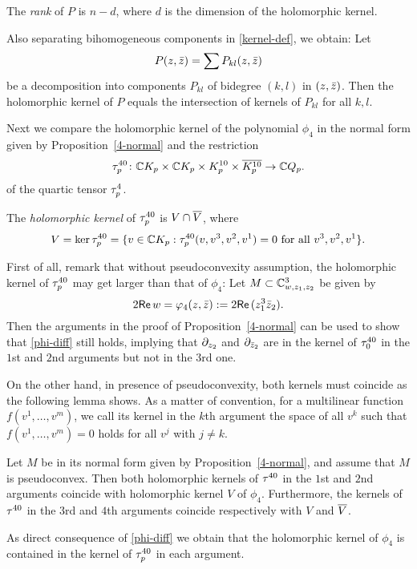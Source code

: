 \documentclass[12pt]{amsart}
\begin{document}
\bd{}
	The {\em rank} of $P$ is $n-d$, where $d$ is the dimension of the holomorphic kernel.
\ed

Also separating bihomogeneous components in \eqref{kernel-def}, we obtain:
\bl
	Let 
	$$
		P(z,{\bar z})=\sum P_{kl}(z,{\bar z})
	$$ 
	be a decomposition into components $P_{kl}$ of bidegree $(k,l)$ in $(z,{\bar z})$.
	Then the holomorphic kernel of $P$ equals the intersection of kernels of $P_{kl}$ for all $k,l$.
\el

Next we compare the holomorphic kernel of the polynomial $\phi_4$
in the normal form given by Proposition~\ref{4-normal}
and the restriction 
$$
	\tau^{40}_p \colon {\mathbb{C}} K_p \times {\mathbb{C}} K_p \times K^{10}_p \times \overline{K^{10}_p} \to {\mathbb{C}} Q_p.
$$
of the quartic tensor $\tau^4_p$.

\bd
The {\em holomorphic kernel} of $\tau^{40}_p$ is 
$V\cap \overline{V}$, where
$$
	V = \ker \tau^{40}_p = \{ v\in {\mathbb{C}} K_p : 
		\tau^{40}_p(v, v^3, v^2, v^1) =0
		\text{ for all }
		v^3, v^2, v^1\}.
$$
\ed

First of all, remark that 
without pseudoconvexity assumption,
the holomorphic kernel of $\tau^{40}_p$
may get larger than that of $\phi_4$:
\be{}
Let $M\subset {\mathbb{C}}^3_{w, z_1, z_2}$ be given by
$$
	2{\sf Re}\, w = \varphi_4(z,{\bar z}):= 2{\sf Re}\, (z_1^3 {\bar z}_2).
$$
Then the arguments in the proof of Proposition~\ref{4-normal}
can be used to show that \eqref{phi-diff} still holds,
implying that $\partial_{z_2}$ and $\partial_{{\bar z}_2}$
are in the kernel of $\tau^{40}_0$
in the $1$st and $2$nd arguments
but not in the $3$rd one.
\ee

On the other hand, in presence of pseudoconvexity,
both kernels must coincide as the following lemma shows.
As a matter of convention, for a multilinear function 
$f(v^1, \ldots, v^m)$, we call its kernel in the $k$th argument
the space of all $v^k$ such that $f(v^1, \ldots, v^m)=0$ holds
for all $v^j$ with $j\ne k$.

\bl{}
	Let $M$ be in its normal form given by Proposition~\ref{4-normal},
	and
	assume that $M$ is pseudoconvex.
	Then both holomorphic kernels of $\tau^{40}$ in the $1$st and $2$nd arguments coincide with holomorphic kernel 
	$V$ of $\phi_4$.
	Furthermore,
	the kernels of $\tau^{40}$ in the $3$rd and $4$th arguments
	 coincide respectively with $V$ and $\overline{V}$.
\el


\bpf
As direct consequence of \eqref{phi-diff} we obtain
that the holomorphic kernel of $\phi_4$ is contained
in the kernel of $\tau^{40}_p$ in each argument.
\end{document}
